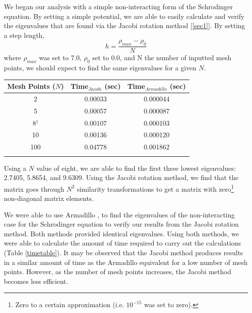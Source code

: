 \documentclass[%
reprint,
superscriptaddress,
showpacs,
nofootinbib,
bibnotes,amsmath,amssymb,aps,
prc, 
]{revtex4-1}
\begin{document}
	We began our analysis with a simple non-interacting form of the Schr$\ddot{\textrm{o}}$dinger equation.  By setting a simple potential, we are able to easily calculate and verify the eigenvalues that are found via the Jacobi rotation method [\ref{sec1}].  By setting a step length, \begin{equation}
	h=\frac{\rho_{max}-\rho_{0}}{N}
	\end{equation} where $\rho_{max}$ was set to 7.0, $\rho_{0}$ set to 0.0, and N the number of inputted mesh points, we should expect to find the same eigenvalues for a given $N$.
	
		\begin{center}
		\begin{tabular}{ccc}
			\hline \hline
			Mesh Points ($N$) &  Time$_{Jacobi}$ (sec) & Time$_{Armadillo}$ (sec)\\
			\hline
			2 & 0.00033 & 0.000044\\
			5 & 0.00057 & 0.000087\\
			8$^{\dagger}$ & 0.00107 & 0.000103\\
			10 & 0.00136 & 0.000120\\
			100 & 0.04778 & 0.001862\\
			\hline
			\label{timetable}
		\end{tabular}
	\end{center}

	Using a $N$ value of eight, we are able to find the first three lowest eigenvalues: 2.7405, 5.8654, and 9.6309.  Using the Jacobi rotation method, we find that the matrix goes through $N^{2}$ similarity transformations to get a matrix with zero\footnote{Zero to a certain approximation (i.e. $10^{-15}$ was set to zero).} non-diagonal matrix elements.


	We were able to use Armadillo \cite{Armadillo}, to find the eigenvalues of the non-interacting case for the Schr$\ddot{\textrm{o}}$dinger equation to verify our results from the Jacobi rotation method. Both methods provided identical eigenvalues.  Using both methods, we were able to calculate the amount of time required to carry out the calculations (Table \ref{timetable}).  It may be observed that the Jacobi method produces results in a similar amount of time as the Armadillo equivalent for a low number of mesh points.  However, as the number of mesh points increases, the Jacobi method becomes less efficient.
	
\end{document}
